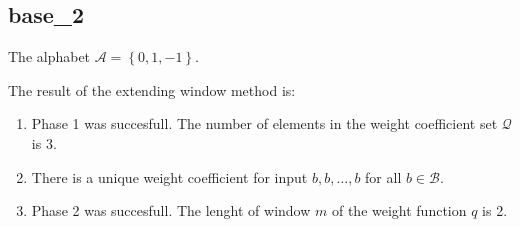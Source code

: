 \subsection{ base\_2 }

\label{subsec:base2}

The alphabet $\mathcal{A} =\left\{0, 1, -1\right\}$.

\noindent The result of the extending window method is:
\begin{enumerate}
    \item Phase 1 was succesfull.
The number of elements in the weight coefficient set $\mathcal{Q}$ is $3$.

    \item There is a unique weight coefficient for input $b,b,\dots,b$ for all $b\in\mathcal{B}$.

    \item Phase 2 was succesfull.
The lenght of window $m$ of the weight function $q$ is 2.
\end{enumerate}
